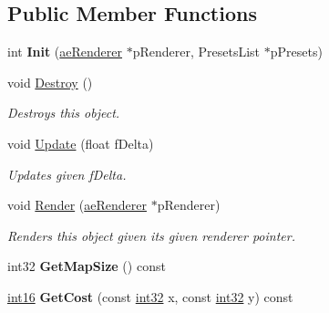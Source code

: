 \subsection*{Public Member Functions}
\begin{DoxyCompactItemize}
\item 
int {\bfseries Init} (\hyperlink{classae_core_1_1ae_renderer}{ae\+Renderer} $\ast$p\+Renderer, Presets\+List $\ast$p\+Presets)\hypertarget{classae_tiled_map_a3e7d015f09c6cfca2a9f72f8fef9c2a4}{}\label{classae_tiled_map_a3e7d015f09c6cfca2a9f72f8fef9c2a4}

\item 
void \hyperlink{classae_tiled_map_a905504860f36560db80a307fcd3398b7}{Destroy} ()\hypertarget{classae_tiled_map_a905504860f36560db80a307fcd3398b7}{}\label{classae_tiled_map_a905504860f36560db80a307fcd3398b7}

\begin{DoxyCompactList}\small\item\em Destroys this object. \end{DoxyCompactList}\item 
void \hyperlink{classae_tiled_map_a96e6f64deda9d9d02fef3cd173e900a8}{Update} (float f\+Delta)
\begin{DoxyCompactList}\small\item\em Updates given f\+Delta. \end{DoxyCompactList}\item 
void \hyperlink{classae_tiled_map_a3f0816ebe094c6a1308524936d6c926e}{Render} (\hyperlink{classae_core_1_1ae_renderer}{ae\+Renderer} $\ast$p\+Renderer)
\begin{DoxyCompactList}\small\item\em Renders this object given its given renderer pointer. \end{DoxyCompactList}\item 
int32 {\bfseries Get\+Map\+Size} () const \hypertarget{classae_tiled_map_afcb55146c076d64a9b2f21f07fbebea4}{}\label{classae_tiled_map_afcb55146c076d64a9b2f21f07fbebea4}

\item 
\hyperlink{namespaceae_core_ad0f2d0ae721a7f0afb159366dcc2da9c}{int16} {\bfseries Get\+Cost} (const \hyperlink{namespaceae_core_a862bc39eb87cfabca273f49e2a920129}{int32} x, const \hyperlink{namespaceae_core_a862bc39eb87cfabca273f49e2a920129}{int32} y) const \hypertarget{classae_tiled_map_a9bc8dfe7b53c912d85d108bcbc303e32}{}\label{classae_tiled_map_a9bc8dfe7b53c912d85d108bcbc303e32}


\end{DoxyCompactItemize}
